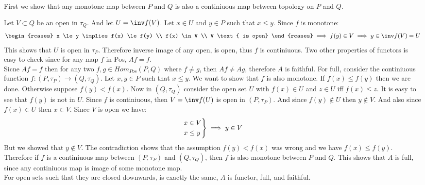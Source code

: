 First we show that any monotone map between $P$ and $Q$ is also a continiuous map between topology on $P$ and $Q$.
\begin{center}
\end{center}
Let $V \subset Q$ be an open in $\tau_Q$. And let $U = \inv f(V)$. Let $x \in U$ and $y \in P$ such that $x \le y$. Since $f$ is monotone:
\begin{gather*}
    \begin{rcases}
        x \le y \implies f(x) \le f(y) \\
        f(x) \in V \\
        V \text{ is open}
    \end{rcases} \implies f(y) \in V \implies y \in \inv f(V) = U
\end{gather*}
This shows that $U$ is open in $\tau_P$. Therefore inverse image of any open, is open, thus $f$ is continiuous. Two other properties of functors is easy to check since for any map $f$ in Pos, $Af = f$.\\
Sicne $Af = f$ then for any two $f, g \in Hom_{Pos}(P, Q)$ where $f \ne g$, then $Af \ne Ag$, therefore $A$ is faithful. For full, consider the continiuous function $f: (P, \tau_P) \to (Q, \tau_Q)$. Let $x, y \in P$ such that $x \le y$. We want to show that $f$ is also monotone. If $f(x) \le f(y)$ then we are done. Otherwise suppose $f(y) < f(x)$.
Now in $(Q, \tau_Q)$ consider the open set $U$ with $f(x) \in U$ and $z \in U$ iff $f(x) \le z$. It is easy to see that $f(y)$ is not in $U$. Since $f$ is continiuous, then $V = \inv f(U)$ is open in $(P, \tau_P)$. And since $f(y) \notin U$ then $y \notin V$. And also since $f(x) \in U$ then $x \in V$. Since $V$ is open we have:
\begin{gather*}
    \begin{rcases}
        x \in V \\
        x \le y
    \end{rcases} \implies y \in V
\end{gather*}
But we showed that $y \notin V$. The contradiction shows that the assumption $f(y) < f(x)$ was wrong and we have $f(x) \le f(y)$. Therefore if $f$ is a continiuous map between $(P, \tau_P)$ and $(Q, \tau_Q)$, then $f$ is also monotone between $P$ and $Q$. This shows that $A$ is full, since any continiuous map is image of some monotone map. \\
For open sets such that they are closed downwards, is exactly the same, $A$ is functor, full, and faithful.